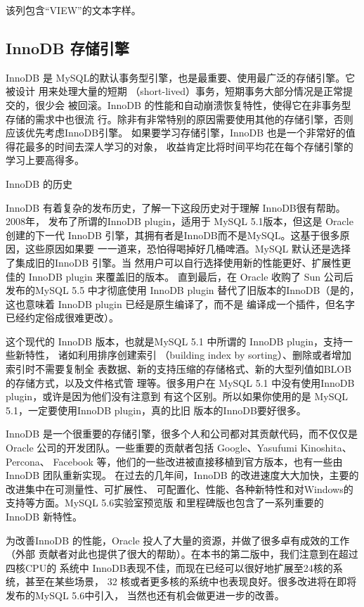 该列包含“VIEW”的文本字样。

\subsection{InnoDB 存储引擎}
InnoDB 是 MySQL的默认事务型引擎，也是最重要、使用最广泛的存储引擎。它被设计
用来处理大量的短期 （short-lived）事务，短期事务大部分情况是正常提交的，很少会
被回滚。InnoDB 的性能和自动崩溃恢复特性，使得它在非事务型存储的需求中也很流
行。除非有非常特别的原因需要使用其他的存储引擎，否则应该优先考虑InnoDB引擎。
如果要学习存储引擎，InnoDB 也是一个非常好的值得花最多的时间去深人学习的对象，
收益肯定比将时间平均花在每个存储引擎的学习上要高得多。

InnoDB 的历史

InnoDB 有着复杂的发布历史，了解一下这段历史对于理解 InnoDB很有帮助。2008年，
发布了所谓的InnoDB plugin，适用于 MySQL 5.1版本，但这是 Oracle 创建的下一代
InnoDB 引擎，其拥有者是InnoDB而不是MySQL。这基于很多原因，这些原因如果要
一一道来，恐怕得喝掉好几桶啤酒。MySQL 默认还是选择了集成旧的InnoDB 引擎。当
然用户可以自行选择使用新的性能更好、扩展性更佳的 InnoDB plugin 来覆盖旧的版本。
直到最后，在 Oracle 收购了 Sun 公司后发布的MySQL 5.5 中才彻底使用 InnoDB plugin
替代了旧版本的InnoDB（是的，这也意味着 InnoDB plugin 已经是原生编译了，而不是
编译成一个插件，但名字已经约定俗成很难更改）。

这个现代的 InnoDB 版本，也就是MySQL 5.1 中所谓的 InnoDB plugin，支持一些新特性，
诸如利用排序创建索引 （building index by sorting）、删除或者增加索引时不需要复制全
表数据、新的支持压缩的存储格式、新的大型列值如BLOB 的存储方式，以及文件格式管
理等。很多用户在 MySQL 5.1 中没有使用InnoDB plugin，或许是因为他们没有注意到
有这个区别。所以如果你使用的是 MySQL 5.1，一定要使用InnoDB plugin，真的比旧
版本的InnoDB要好很多。

InnoDB 是一个很重要的存储引擎，很多个人和公司都对其贡献代码，而不仅仅是
Oracle 公司的开发团队。一些重要的贡献者包括 Google、Yasufumi Kinoshita、Percona、
Facebook 等，他们的一些改进被直接移植到官方版本，也有一些由InnoDB 团队重新实现。
在过去的几年间，InnoDB 的改进速度大大加快，主要的改进集中在可测量性、可扩展性、
可配置化、性能、各种新特性和对Windows的支持等方面。MySQL 5.6实验室预览版
和里程碑版也包含了一系列重要的 InnoDB 新特性。

为改善InnoDB 的性能，Oracle 投人了大量的资源，并做了很多卓有成效的工作（外部
贡献者对此也提供了很大的帮助）。在本书的第二版中，我们注意到在超过四核CPU的
系统中 InnoDB表现不佳，而现在已经可以很好地扩展至24核的系统，甚至在某些场景，
32 核或者更多核的系统中也表现良好。很多改进将在即将发布的MySQL 5.6中引入，
当然也还有机会做更进一步的改善。

